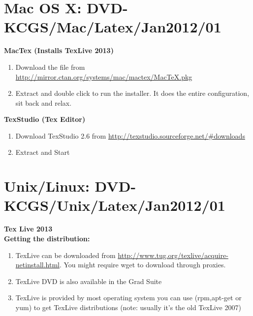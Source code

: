 \documentclass[a4paper,twoside,12pt,fleqn,openright]{article}
\begin{document}
\section*{Mac OS X: DVD-KCGS/Mac/Latex/Jan2012/01}
\textbf{MacTex (Installs TexLive 2013)}\\
\begin{enumerate}
\item	Download the file from \href{http://mirror.ctan.org/systems/mac/mactex/MacTeX.pkg}{http://mirror.ctan.org/systems/mac/mactex/MacTeX.pkg}
\item	Extract and double click to run the installer. It does the entire configuration, sit back and relax.
\end{enumerate}

\textbf{TexStudio (Tex Editor)}
\begin{enumerate}
\item	Download TexStudio 2.6 from \href{http://texstudio.sourceforge.net/\#downloads}{http://texstudio.sourceforge.net/\#downloads} 
\item	Extract and Start
\end{enumerate}


\section*{Unix/Linux: DVD-KCGS/Unix/Latex/Jan2012/01}
\textbf{Tex Live 2013}\\
\textbf{Getting the distribution:}\\
\begin{enumerate}
\item	TexLive can be downloaded from \href{http://www.tug.org/texlive/acquire-netinstall.html}{http://www.tug.org/texlive/acquire-netinstall.html}. You might require wget to download through proxies.
\item	TexLive DVD is also available in the Grad Suite
\item	TexLive is provided by most operating system you can use (rpm,apt-get or yum) to get TexLive distributions (note: usually it's the old TexLive 2007) 
\end{enumerate}
\end{document}
